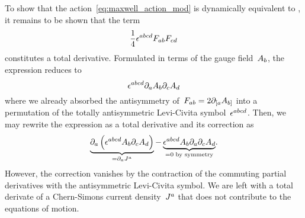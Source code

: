 To show that the action~\eqref{eq:maxwell_action_mod} is dynamically equivalent to , it remains to be shown that the term
\begin{equation}
	\frac{1}{4}\epsilon^{abcd}F_{ab}F_{cd}
\end{equation}
constitutes a total derivative. Formulated in terms of the gauge field~$A_b$, the expression reduces to
\begin{equation}
	\epsilon^{abcd}\partial_aA_b\partial_cA_d
\end{equation}
where we already absorbed the antisymmetry of~$F_{ab}=2\partial_{[ a}A_{b]}$ into a permutation of the totally antisymmetric Levi-Civita symbol~$\epsilon^{abcd}$. Then, we may rewrite the expression as a total derivative and its correction as
\begin{equation}
	\underbrace{\partial_a\left(\epsilon^{abcd}A_b\partial_cA_d\right)}_{=\partial_aJ^a}
	-\underbrace{\epsilon^{abcd}A_b\partial_a\partial_cA_d}_{=0\;\text{by symmetry}}
	\mathpunct{.}
\end{equation}
However, the correction vanishes by the contraction of the commuting partial derivatives with the antisymmetric Levi-Civita symbol. We are left with a total derivate of a Chern-Simons current density~$J^a$ that does not contribute to the equations of motion.

